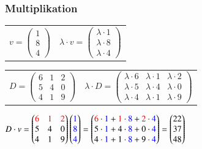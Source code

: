 		    
\subsubsection{Multiplikation}

\begin{tabular}{ll}
	$v = 
	\begin{pmatrix}
		1\\8\\4 
	\end{pmatrix}$ &
	$\lambda \cdot v = 
	\begin{pmatrix} 
		\lambda \cdot 1\\
		\lambda \cdot 8\\
		\lambda \cdot 4
	\end{pmatrix}$ 
\end{tabular}

\vspace{0.2cm}

\begin{tabular}{ll}
	$D =
	\begin{pmatrix}
		6&1&2\\
		5&4&0\\
		4&1&9
	\end{pmatrix}$ &
	$\lambda \cdot D =
	\begin{pmatrix}
		\lambda \cdot 6 & \lambda \cdot 1 & \lambda \cdot 2 \\
		\lambda \cdot 5 & \lambda \cdot 4 & \lambda \cdot 0 \\
		\lambda \cdot 4 & \lambda \cdot 1 & \lambda \cdot 9
	\end{pmatrix}$ 
\end{tabular}

\vspace{0.2cm}	

$D \cdot v = 
	\begin{pmatrix}
		\color{red}6&\color{red}1&\color{red}2\\
		5&4&0\\
		4&1&9
	\end{pmatrix}
	\begin{pmatrix}
		\color{blue}1\\
		\color{blue}8\\
		\color{blue}4
	\end{pmatrix}
	=
	\begin{pmatrix}
		{\color{red}6}\cdot{\color{blue}1}+
		{\color{red}1}\cdot{\color{blue}8}+
		{\color{red}2}\cdot{\color{blue}4}
		\\
		5\cdot{\color{blue}1}+
		4\cdot{\color{blue}8}+
		0\cdot{\color{blue}4}
		\\
		4\cdot{\color{blue}1}+
		1\cdot{\color{blue}8}+
		9\cdot{\color{blue}4}
	\end{pmatrix}
	=
	\begin{pmatrix}
		22\\37\\48
	\end{pmatrix}$ 


